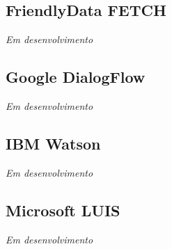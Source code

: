 \subsection{FriendlyData FETCH}
\textit{Em desenvolvimento}

\subsection{Google DialogFlow}
\textit{Em desenvolvimento}

\subsection{IBM Watson}
\textit{Em desenvolvimento}

\subsection{Microsoft LUIS}
\textit{Em desenvolvimento}

